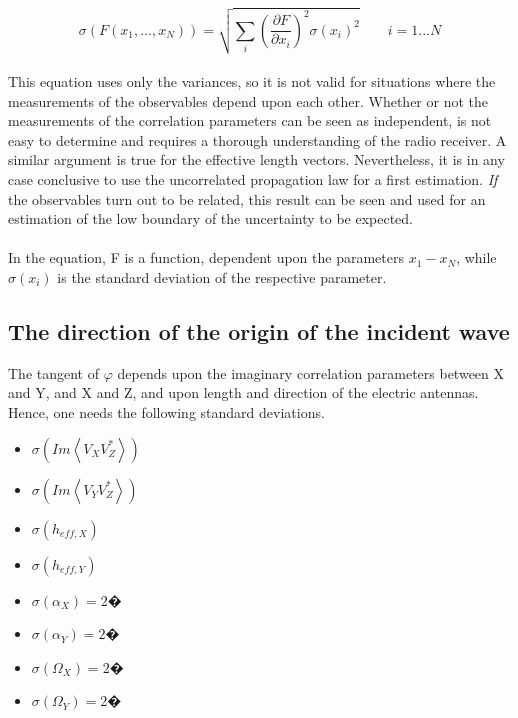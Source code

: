 \documentclass[a4paper,10pt]{thesis}
\begin{document}
\begin{equation}
\sigma (F(x_1,...,x_N))= \sqrt{\sum_i (\frac{\partial F}{\partial x_i})^2 \sigma (x_i)^2} \qquad i=1...N
\end{equation}
\paragraph*{}
This equation uses only the variances, so it is not valid for situations where the measurements of the observables depend upon each other. Whether or not the measurements of the correlation parameters can be seen as independent, is not easy to determine and requires a thorough understanding of the radio receiver. A similar argument is true for the effective length vectors. Nevertheless, it is in any case conclusive to use the uncorrelated propagation law for a first estimation. \textit{If} the observables turn out to be related, this result can be seen and used for an estimation of the low boundary of the uncertainty to be expected.

\paragraph*{}
In the equation, F is a function, dependent upon the parameters $x_1 - x_N$, while $\sigma(x_i)$ is the standard deviation of the respective parameter.

\subsection{The direction of the origin of the incident wave}
The tangent of $\varphi$ depends upon the imaginary correlation parameters between X and Y, and X and Z, and upon length and direction of the electric antennas. Hence, one needs the following standard deviations.

\begin{itemize}
\item $\sigma (Im \left\langle V_X V_Z^{*}\right\rangle)$
\item $\sigma (Im \left\langle V_Y V_Z^{*}\right\rangle)$
\item $\sigma (h_{eff,X})$
\item $\sigma (h_{eff,Y})$
\item $\sigma (\alpha_X)=2�$
\item $\sigma (\alpha_Y)=2�$
\item $\sigma (\Omega_X)=2�$
\item $\sigma (\Omega_Y)=2�$
\end{itemize}
\end{document}

